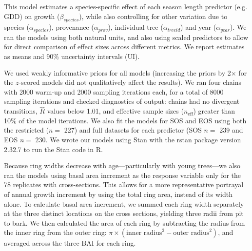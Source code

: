 This model estimates a species-specific effect of each season length predictor (e.g. GDD) on growth ($\beta_{species}$), while also controlling for other variation due to species ($\alpha_{species}$), provenance ($\alpha_{prov}$), individual tree ($\alpha_{treeid}$) and year ($\alpha_{year}$). We ran the models using both natural units, and also using scaled predictors \citep[via $z$-scoring;][]{gelman_data_2006} to allow for direct comparison of effect sizes across different metrics. We report estimates as means and 90\% uncertainty intervals (UI).  

We used weakly informative priors for all models (increasing the priors by 2$\times$ for the $z$-scored models did not qualitatively affect the results). We ran four chains with 2000 warm-up and 2000 sampling iterations each, for a total of 8000 sampling iterations and checked diagnostics of output: chains had no divergent transitions, $\hat{R}$ values below 1.01, and effective sample sizes ($n_{\text{eff}}$) greater than 10\% of the model iterations. We also fit the models for SOS and EOS using both the restricted ($n =$ 227) and full datasets for each predictor (SOS $n =$ 239 and EOS $n =$ 230. We wrote our models using Stan \citep{carpenter_stan_2017} with the rstan package version 2.32.7 \citep{standevelopmentteam_rstan_2025} to run the Stan code in R. 

Because ring widths decrease with age---particularly with young trees---we also ran the models using basal area increment as the response variable only for the 78 replicates with cross-sections. This allows for a more representative portrayal of annual growth increment by using the total ring area, instead of its width alone. To calculate basal area increment, we summed each ring width separately at the three distinct locations on the cross sections, yielding three radii from pit to bark. We then calculated the area of each ring by subtracting the radius from the inner ring from the outer ring: $\pi \times (\text{inner radius}^2 - \text{outer radius}^2)$, and averaged across the three BAI for each ring. 


